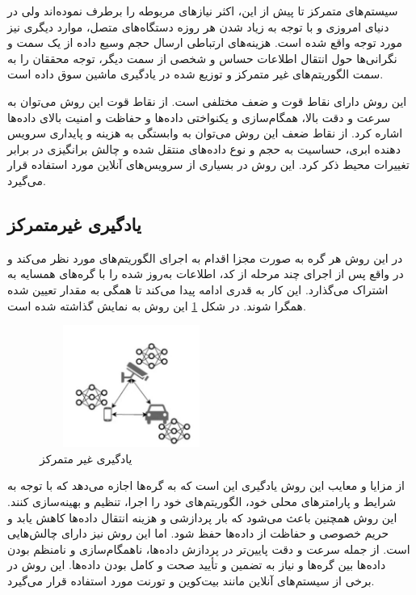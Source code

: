 سیستم‌های متمرکز تا پیش از این، اکثر نیازهای مربوطه را برطرف نموده‌اند ولی در دنیای امروزی و با توجه به زیاد شدن هر روزه دستگاه‌های متصل، موارد دیگری نیز مورد توجه واقع شده است. هزینه‌های ارتباطی ارسال حجم وسیع داده از یک سمت و نگرانی‌ها حول انتقال اطلاعات حساس و شخصی از سمت دیگر، توجه محققان را به سمت الگوریتم‌های غیر متمرکز و توزیع شده در یادگیری ماشین سوق داده است.

این روش دارای نقاط قوت و ضعف مختلفی است. از نقاط قوت این روش می‌توان به سرعت و دقت بالا، همگام‌سازی و یکنواختی داده‌ها و حفاظت و امنیت بالای داده‌ها اشاره کرد. از نقاط ضعف این روش می‌توان به وابستگی به هزینه و پایداری سرویس دهنده ابری، حساسیت به حجم و نوع داده‌های منتقل شده و چالش برانگیزی در برابر تغییرات محیط ذکر کرد. این روش در بسیاری از سرویس‌های آنلاین مورد استفاده قرار می‌گیرد.

\subsection{یادگیری غیرمتمرکز}

    در این روش هر گره به صورت مجزا اقدام به اجرای الگوریتم‌های مورد نظر می‌کند و در واقع پس از اجرای چند مرحله از کد، اطلاعات به‌روز شده را با گره‌های همسایه به اشتراک می‌گذارد. این کار به قدری ادامه پیدا می‌کند تا همگی به مقدار تعیین شده همگرا شوند. در شکل \ref{decentralized} این روش به نمایش گذاشته شده است.

    \begin{figure}[H]
      \centering
      \includegraphics[height=4cm,width=6cm]{./types of ML/decentralized .jpg}
      \caption[یادگیری غیر متمرکز]{ یادگیری غیر متمرکز\cite{ref6}}
      \label{decentralized}
      \centering
    \end{figure}

 از مزایا و معایب این روش یادگیری این است که به گره‌ها اجازه می‌دهد که با توجه به شرایط و پارامتر‌های محلی خود، الگوریتم‌های خود را اجرا، تنظیم و بهینه‌سازی کنند. این روش همچنین باعث می‌شود که بار پردازشی و هزینه انتقال داده‌ها کاهش یابد و حریم خصوصی و حفاظت از داده‌ها حفظ شود. اما این روش نیز دارای چالش‌هایی است. از جمله سرعت و دقت پایین‌تر در پردازش داده‌ها، ناهمگام‌سازی و نامنظم بودن داده‌ها بین گره‌ها و نیاز به تضمین و تأیید صحت و کامل بودن داده‌ها. این روش در برخی از سیستم‌های آنلاین مانند بیت‌کوین و تورنت مورد استفاده قرار می‌گیرد.

